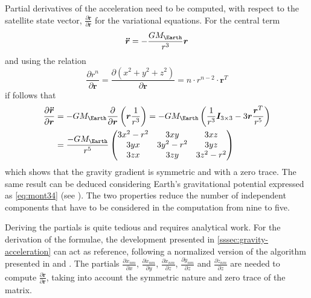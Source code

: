 Partial derivatives of the acceleration need to be computed, with respect to the 
satellite state vector, $\frac{\partial \bm{\ddot{r}}}{\partial \bm{r}}$ for the 
variational equations. For the central term
\begin{equation}
  \bm{\ddot{r}} = - \frac{GM_{\Earth}}{r^3}\bm{r}
\end{equation}
and using the relation
\begin{equation}
  \frac{\partial r^n}{\partial \bm{r}} = 
    \frac{\partial \left(x^2 + y^2 + z^2 \right)}{\partial \bm{r}} = 
      n \cdot r^{n-2} \cdot \bm{r}^T
\end{equation}
if follows that
\begin{equation}
  \begin{aligned}
    \frac{\partial \bm{\ddot{r}}}{\partial \bm{r}} &= 
    -GM_{\Earth} \frac{\partial}{\partial \bm{r}}\left( \bm{r} \frac{1}{r^3} \right) = 
    -GM_{\Earth} \left( \frac{1}{r^3}\bm{I}_{3\times 3} - 3\bm{r} \frac{\bm{r}^T}{r^5} \right) \\
    &=\frac{-GM_{\Earth}}{{r^5}} \begin{pmatrix}
      3x^2-r^2 & 3xy      & 3xz \\
      3yx      & 3y^2-r^2 & 3yz \\
      3zx      & 3zy      & 3z^2 -r^2
    \end{pmatrix}
  \end{aligned}
\end{equation}
which shows that the gravity gradient is symmetric and with a zero trace. The same result 
can be deduced considering Earth's gravitational potential expressed as \autoref{eq:mont34} 
(see \cite{Montenbruck2000}). The two properties reduce the number of independent 
components that have to be considered in the computation from nine to five. 

Deriving the partials is quite tedious and requires analytical work. For the 
derivation of the formulae, the development presented in \autoref{sssec:gravity-acceleration} 
can act as reference, following a normalized version of the algorithm presented 
in \cite{Cunningham1970} and \cite{Montenbruck2000}. The partials 
$\frac{\partial \ddot{x}_{nm}}{\partial x}$, 
$\frac{\partial \ddot{x}_{nm}}{\partial y}$, $\frac{\partial \ddot{x}_{nm}}{\partial z}$, 
$\frac{\partial \ddot{y}_{nm}}{\partial z}$ and $\frac{\partial \ddot{z}_{nm}}{\partial z}$ 
are needed to compute $\frac{\partial \bm{\ddot{r}}}{\partial \bm{r}}$, taking 
into account the symmetric nature and zero trace of the matrix.

